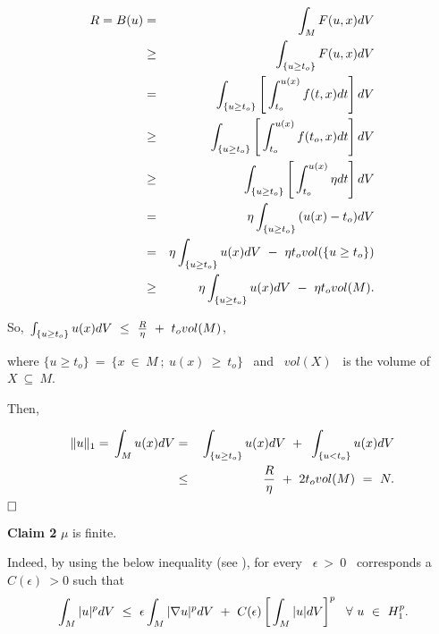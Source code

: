 \documentclass[12pt]{article}
\begin{document}
\begin{eqnarray*}
R = B(u) & = & {\displaystyle}\int_M{F(u,x)dV} \\
  & \geq & {\displaystyle}\int_{\{u \geq t_o \}}{F(u,x)dV} \\
  & = & {\displaystyle}\int_{\{u \geq t_o \}}{\left[{\displaystyle}\int_{t_o}^{u(x)}{f(t,x)dt}\right]dV} \\ 
  & \geq & {\displaystyle}\int_{\{u \geq t_o \}}{\left[{\displaystyle}\int_{t_o}^{u(x)}{f(t_o,x)dt}\right]dV} \\
  & \geq & {\displaystyle}\int_{\{u \geq t_o \}}{\left[{\displaystyle}\int_{t_o}^{u(x)}{\eta dt}\right]dV} \\ 
  & = & \eta {\displaystyle}\int_{\{u \geq t_o \}}{(u(x) - t_o)dV} \\
  & = & \eta {\displaystyle}\int_{\{u \geq t_o \}}{u(x)dV} \ - \ \eta t_ovol(\{u \geq t_o \}) \\
  & \geq & \eta {\displaystyle}\int_{\{u \geq t_o \}}{u(x)dV} \ -\  \eta t_ovol(M).
\end{eqnarray*}

So, ${\displaystyle}\int_{\{u \geq t_o \}}{u(x)dV} \ \leq \ {\displaystyle}\frac{R}{\eta} \ + \ t_o vol(M)$, 
{\vspace{0.2cm}}

\noindent  where $\{u \geq t_o \} \ = \ \{x \ \in \ M \ ; \ u(x) \ \geq \ t_o \}$ \ and
 \ $vol(X)$ \ is the volume of $X \ \subseteq \ M$. 
{\vspace{0.2cm}}

\noindent  Then, 
\vspace{-1cm}

\begin{eqnarray*}
 \|u \|_1  =  {\displaystyle}\int_M{u(x)dV} & = & {\displaystyle}\int_{\{u \geq t_o \}}{u(x)dV} \ + \ {\displaystyle}\int_{\{u < t_o\}}{u(x)dV} \\
 & \leq & {\displaystyle}\frac{R}{\eta} \ + \ 2t_ovol(M) \ = \ N. 
\end{eqnarray*}
{$\hfill{\Box}$}

{\bf Claim 2}
$\mu$ is finite.

Indeed, by using the  below inequality  (see \cite{aubin6}), for every \ $\epsilon \ > \ 0$ \ corresponds a \ $C(\epsilon) \ > 0$
such that
\begin{eqnarray}
\label{2.1}
{\displaystyle}\int_M{|u|^pdV} \ \leq \ \epsilon {\displaystyle}\int_M{|\nabla u|^pdV} \ + \ C(\epsilon)\left[{\displaystyle}\int_M{|u|dV}\right]^p 
\ \  \forall \ u \ \in \ H^p_1.
\end{eqnarray}
\end{document}
